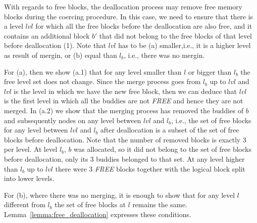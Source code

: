 With regards to free blocks, the deallocation process may remove free memory blocks during the coercing procedure. In this case, we need to ensure that there is a level $lvl$ for which all the free blocks before the deallocation are also free, and it contains an additional block $b'$ that did not belong to the free blocks of that level before deallocation (1). Note that $lvl$ has to be (a) smaller,i.e., it is a higher level as result of mergin, or (b) equal than $l_b$, i.e., there was no mergin. 

For (a), then we show (a.1) that for any level smaller than $l$ or bigger than $l_b$ the free level set does not change. Since the merge process goes from $l_b$ up to $lvl$ and  $lvl$ is the level in which we have the new free block, then we can deduce that $lvl$ is the first level in which all the buddies are not \emph{FREE} and hence they are not merged. In (a.2) we show that the merging process has removed the buddies of $b$ and subsequently nodes on any level between $lvl$ and $l_b$, i.e., the set of free blocks for any level between $lvl$ and $l_b$ after deallocation is a subset of the set of free blocks before deallocation. Note that the number of removed blocks is exactly 3 per level. At level $l_b$, $b$ was allocated, so it did not belong to the set of free blocks before deallocation, only its 3 buddies belonged to that set. At any level higher than $l_b$ up to $lvl$ there were 3 \emph{FREE} blocks together with the logical block split into lower levels.

 For (b), where there was no merging, it is enough to show that for any level $l$ different from $l_b$ the set of free blocks at $l$ remains the same.  Lemma~\ref{lemma:free_deallocation} expresses these conditions.



